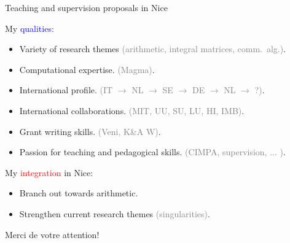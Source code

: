 \documentclass[usenames,dvipsnames]{beamer}
\def\Z{\mathbb{Z}}
\def\F{\mathbb{F}}
\DeclareMathOperator{\GL}{GL}
\begin{document}
\begin{frame}{Teaching and supervision proposals in Nice}
\end{frame}

\begin{frame}{ }
My \textcolor{blue}{qualities}:
\begin{itemize}
     \item Variety of research themes \textcolor{gray}{(arithmetic, integral matrices, comm.~alg.)}.
     \item Computational expertise. \textcolor{gray}{(Magma)}.
     \item International profile. \textcolor{gray}{(IT $\to$ NL $\to$ SE $\to$ DE $\to$ NL $\to$ ?)}.
     \item International collaborations. \textcolor{gray}{(MIT, UU, SU, LU, HI, IMB)}.
     \item Grant writing skills. \textcolor{gray}{(Veni, K\&A W)}.
     \item Passion for teaching and pedagogical skills. \textcolor{gray}{(CIMPA, supervision, ... )}.
\end{itemize}
\vspace{1em}
\pause
My \textcolor{red}{integration} in Nice:
\begin{itemize}
     \item Branch out towards arithmetic.
     \item Strengthen current research themes \textcolor{gray}{(singularities)}.
\end{itemize}
\vspace{1em}
\pause
\begin{center}
{\Large Merci de votre attention!}
\end{center}
\end{frame}
\end{document}
